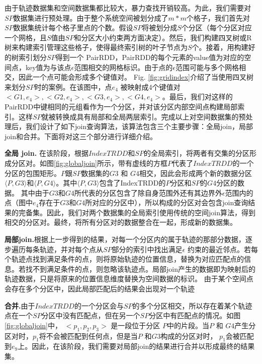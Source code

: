 由于轨迹数据集和空间数据集都比较大，暴力查找开销较高。为此，我们需要对$SP$数据集进行预处理。由于整个系统空间被划分成了$m*m$个格子，我们首先对$SP$数据集统计每个格子里点的个数。假设$SP$将被划分成$S$个分区（每个分区对应一个网格，且$S$值由$SP$和分区大小约束两方面决定）。然后，我们构建四叉树或R树来构建索引管理这些格子，使得最终索引树的叶子节点为$S$个。接着，用构建好的树索引划分$SP$得到一个 PairRDD，PairRDD的每个元素的value值为对应的空间点，key值为与该点$\epsilon$范围相交的网格标识。由于点的$\epsilon$范围可能与多个网格相交，因此一个点可能会形成多个键值对。
Fig. \ref{fig:gridindex}介绍了当使用四叉树来划分$SP$时的案例。在该图中，点$e_{4}$ 被映射成4个键值对$<G1,e_{4}>, <G2, e_{4}>, <G3, e_{4}>, <G4, e_{4}>$。最后，我们对这样的PairRDD中键相同的元组看作为一个分区，并对该分区内部空间点构建局部索引。这样$SP$就被转换成具有局部和全局两层索引。完成以上对空间数据集的预处理后，我们设计了如下join查询算法，该算法包含三个主要步骤：全局join，局部join和合并。下面将对这三个部分进行详细介绍。

\textbf{全局 join.} 在该阶段，根据$IndexTRDD$和$SP$的全局索引，将两者有交集的分区形成分区对。如图\ref{fig:globaljoin}所示，带有虚线的方框$P$代表了$IndexTRDD$的一个分区的包围矩形。$P$跟$SP$数据集的$G3$ 和 $G4$相交，因此会形成两个新的数据分区$\langle P, G3\rangle$和$\langle P, G4\rangle$。其中$\langle P, G3\rangle$包含了IndexTRDD的$P$分区和$SP$的$G4$分区的数据。
其中由于$G3$和$G4$所代表的分区包含了除自身范围外还有其边界外$\epsilon$范围内的点（图中$e_4$存在于$G3$和$G4$所对应的分区中），所以构成的分区对会包含join查询结果的完备集。因此，我们对两个数据集的全局索引使用传统的空间join算法，得到相交的分区对。最终，将所有分区对的数据整合在一起，形成新的数据集。

\textbf{局部join.}根据上一步得到的结果，对每一个分区内的属于轨迹的那部分数据，逐步遍历每条轨迹，并对每个点从$SP$部分的索引中找出满足$\epsilon$ 约束的最近邻点。若每个轨迹点找到满足条件的点，则将原始轨迹的位置信息，替换为对应匹配点的信息。若找不到满足条件的点，则忽略该轨迹点。局部join产生的数据即为映射后的轨迹数据，只是将原来的位置信息维度替换为空间数据的标识。
由于某个空间点会存在多个分区中，因此局部匹配后的结果会出现对一个轨迹

 \textbf{合并.}由于$IndexTRDD$的一个分区会与$SP$的多个分区相交，所以存在着某个轨迹点在一个$SP$分区中没有匹配点，但在另一个$SP$分区中有匹配点的情况。如图 \ref{fig:globaljoin}中， $<p_{1}, p_{2}, p_{3}>$ 是一段位于分区 $P$中的片段。当$P$ 和 $G4$产生分区对时，$p_{1}$将不会被匹配到任何点，但是当$P$ 和$G3$构成的分区对时， $p_{1}$会被匹配到$e_{9}$上。因此，在该阶段，我们需要对局部join的结果进行合并以形成最终的结果集。


